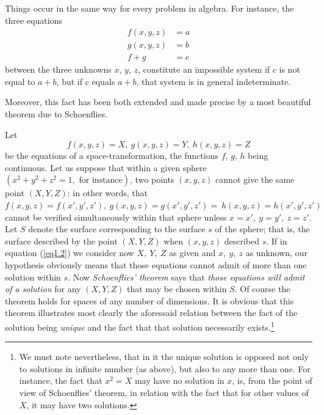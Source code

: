 \documentclass[12pt,oneside]{book}
\begin{document}
Things occur in the same way for every problem in algebra. For instance, the three equations
\begin{align*}
    f(x,y,z)&=a \\
    g(x,y,z)&=b \\
    f+g&=c
\end{align*}
between the three unknowns $x$, $y$, $z$, constitute an impossible system if $c$ is not equal to $a+b$, but if
$c$ equals $a+b$, that system is in general indeterminate. \par

Moreover, this fact has been both extended and made precise by a most beautiful theorem due to Schoenflies. \par

Let
\begin{equation}
    \label{eq1.2}
    f(x,y,z)=X, \ g(x,y,z)=Y, \ h(x,y,z)=Z
\end{equation}
be the equations of a space-transformation, the functions $f$, $g$, $h$ being continuous. Let us suppose that within a given sphere $(x^2+y^2+z^2=1,\text{ for instance})$, two points $(x,y,z)$ cannot give the same point $(X,Y,Z)$: in other words, that $f(x,y,z)=f(x',y',z'),\ g(x,y,z)=g(x',y',z')=\ h(x,y,z)=h(x',y',z')$ cannot be verified simultaneously within that sphere unless $x=x',\ y=y',\ z=z'$. Let $S$ denote the surface corresponding to the surface $s$ of the sphere; that is, the surface described by the point $(X,Y,Z)$ when $(x,y,z)$ described $s$. If in equation (\ref{eq1.2}) we consider now $X,\ Y,\ Z$ as given and $x,\ y,\ z$ as unknown, our hypothesis obviously means that those equations cannot admit of more than one solution within $s$. Now \textit{Schoenflies' theorem} says that \textit{those equations will admit of a solution} for any $(X,Y,Z)$ that may be chosen within $S$. Of course the theorem holds for spaces of any number of dimensions. It is obvious that this theorem illustrates most clearly the aforessaid relation between the fact of the solution being \textit{unique} and the fact that that solution necessarily exists.\footnote{We must note nevertheless, that in it the unique solution is opposed not only to solutions in infinite number (as above), but also to any more than one. For instance, the fact that $x^2=X$ may have no solution in $x$, is, from the point of view of Schoenflies' theorem, in relation with the fact that for other values of $X$, it may have two solutions.} \par
\end{document}
